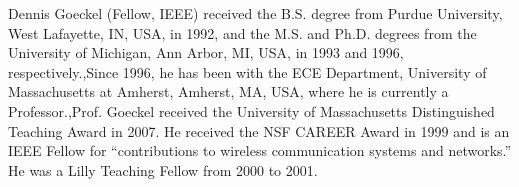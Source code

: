 \begin{IEEEbiography}{Dennis Goeckel}
(Fellow, IEEE) received the B.S. degree from Purdue University, West Lafayette, IN, USA, in 1992, and the M.S. and Ph.D. degrees from the University of Michigan, Ann Arbor, MI, USA, in 1993 and 1996, respectively.,Since 1996, he has been with the ECE Department, University of Massachusetts at Amherst, Amherst, MA, USA, where he is currently a Professor.,Prof. Goeckel received the University of Massachusetts Distinguished Teaching Award in 2007. He received the NSF CAREER Award in 1999 and is an IEEE Fellow for “contributions to wireless communication systems and networks.” He was a Lilly Teaching Fellow from 2000 to 2001.
\end{IEEEbiography}






